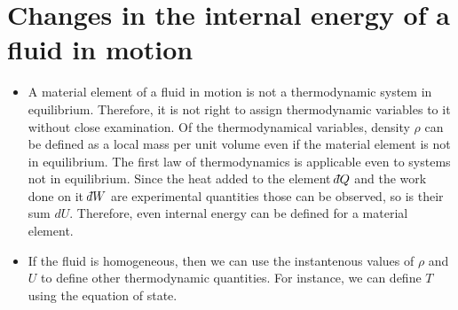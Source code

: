\section{Changes in the internal energy of a fluid in motion}\label{c3s4}
\begin{itemize}
\item A material element of a fluid in motion is not a thermodynamic system in equilibrium. Therefore, it is not right to assign thermodynamic variables to it without close examination.
Of the thermodynamical variables, density $\rho$ can be defined as a local mass per unit volume even if the material element is not in equilibrium. The first law of thermodynamics is
applicable even to systems not in equilibrium. Since the heat added to the element $\dbar Q$ and the work done on it $\dbar W$ are experimental quantities those can be observed, so is 
their sum $dU$. Therefore, even internal energy can be defined for a material element.

\item If the fluid is homogeneous, then we can use the instantenous values of $\rho$ and $U$ to define other thermodynamic quantities. For instance, we can define $T$ using the equation 
of state. 


\end{itemize}
